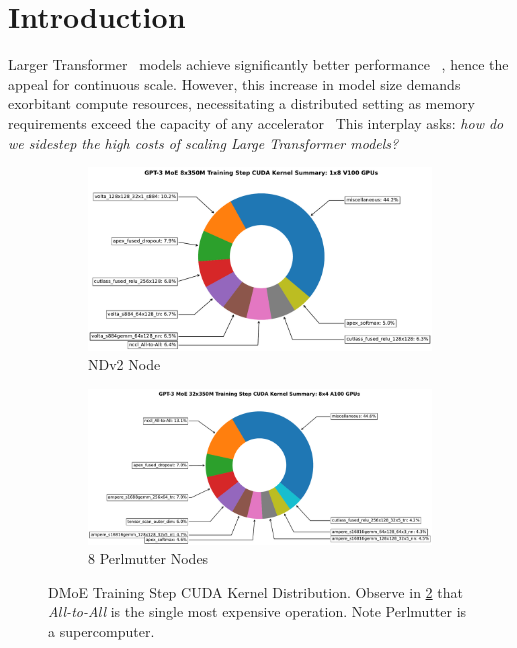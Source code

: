 
\section{Introduction}\label{sec:introduction}
Larger Transformer~\cite{NEURIPS2017_3f5ee243} models achieve significantly better performance
~\cite{DBLP:journals/corr/abs-2005-14165, DBLP:journals/corr/abs-2001-08361},
hence the appeal for continuous scale.
However, this increase in model size demands exorbitant compute resources,
necessitating a distributed setting as memory requirements exceed the capacity of any
accelerator~\cite{DBLP:journals/corr/abs-2201-11990}
This interplay asks:
\emph{how do we sidestep the high costs of scaling Large Transformer models?}
\begin{figure}[!t]
    \begin{subfigure}{.5\linewidth}
        \centering
        \includegraphics[width=0.9\linewidth]{images/single_trace_1x8_donut}
        \caption{NDv2 Node}
        \label{singlepie}
    \end{subfigure}\hfill %
    \begin{subfigure}{.5\linewidth}
        \centering
        \includegraphics[width=\linewidth]{images/multi_sum_8x4_350M_donut}
        \caption{8 Perlmutter Nodes}
        \label{multi_350M_pie}
    \end{subfigure}
    \caption{\footnotesize DMoE Training Step CUDA Kernel Distribution.
    Observe in \ref{multi_350M_pie} that \emph{All-to-All} is the single most expensive operation.
    Note Perlmutter is a supercomputer.}
    \label{fig:donut}
\end{figure}

